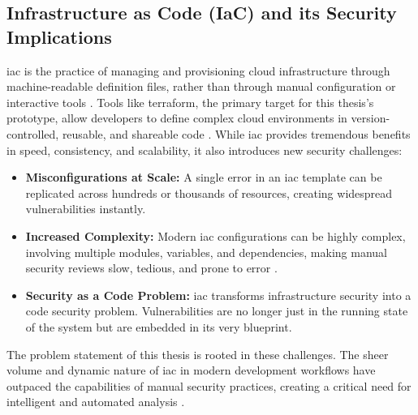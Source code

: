 \subsection{Infrastructure as Code (IaC) and its Security Implications}
\gls{iac} is the practice of managing and provisioning cloud infrastructure through machine-readable definition files, rather than through manual configuration or interactive tools \cite{dasari_infrastructure_2025}. Tools like \gls{terraform}, the primary target for this thesis's prototype, allow developers to define complex cloud environments in version-controlled, reusable, and shareable code \cite{howard_terraform_2022-1}. While \gls{iac} provides tremendous benefits in speed, consistency, and scalability, it also introduces new security challenges:
\begin{itemize}
    \item \textbf{Misconfigurations at Scale:} A single error in an \gls{iac} template can be replicated across hundreds or thousands of resources, creating widespread vulnerabilities instantly.
    \item \textbf{Increased Complexity:} Modern \gls{iac} configurations can be highly complex, involving multiple modules, variables, and dependencies, making manual security reviews slow, tedious, and prone to error \cite{tunc_cloud_2017}.
    \item \textbf{Security as a Code Problem:} \gls{iac} transforms infrastructure security into a code security problem. Vulnerabilities are no longer just in the running state of the system but are embedded in its very blueprint.
\end{itemize}
The problem statement of this thesis is rooted in these challenges. The sheer volume and dynamic nature of \gls{iac} in modern development workflows have outpaced the capabilities of manual security practices, creating a critical need for intelligent and automated analysis \cite{fu_ai_2025}.

